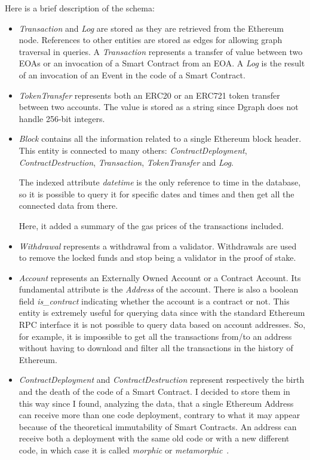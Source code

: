 \noindent Here is a brief description of the schema:

\begin{itemize}

    \item \textit{Transaction} and \textit{Log} are stored as they are retrieved from the Ethereum node. References to other entities are stored as edges for allowing graph traversal in queries. A \textit{Transaction} represents a transfer of value between two EOAs or an invocation of a Smart Contract from an EOA. A \textit{Log} is the result of an invocation of an Event in the code of a Smart Contract.

    \item \textit{TokenTransfer} represents both an ERC20 or an ERC721 token transfer between two accounts. The value is stored as a string since Dgraph does not handle 256-bit integers.
    
    \item \textit{Block} contains all the information related to a single Ethereum block header. This entity is connected to many others: \textit{ContractDeployment}, \textit{ContractDestruction}, \textit{Transaction}, \textit{TokenTransfer} and \textit{Log}. 
    
    The indexed attribute \textit{datetime} is the only reference to time in the database, so it is possible to query it for specific dates and times and then get all the connected data from there. 

    Here, it added a summary of the gas prices of the transactions included.

    \item \textit{Withdrawal} represents a withdrawal from a validator. Withdrawals are used to remove the locked funds and stop being a validator in the proof of stake.

    \item \textit{Account} represents an Externally Owned Account or a Contract Account. Its fundamental attribute is the \textit{Address} of the account. There is also a boolean field \textit{is\_contract} indicating whether the account is a contract or not. This entity is extremely useful for querying data since with the standard Ethereum RPC interface it is not possible to query data based on account addresses. So, for example, it is impossible to get all the transactions from/to an address without having to download and filter all the transactions in the history of Ethereum.

    \item \textit{ContractDeployment} and \textit{ContractDestruction} represent respectively the birth and the death of the code of a Smart Contract. I decided to store them in this way since I found, analyzing the data, that a single Ethereum Address can receive more than one code deployment, contrary to what it may appear because of the theoretical immutability of Smart Contracts. An address can receive both a deployment with the same old code or with a new different code, in which case it is called \textit{morphic} or \textit{metamorphic}~\cite{create2-metamorphic}.


\end{itemize}
